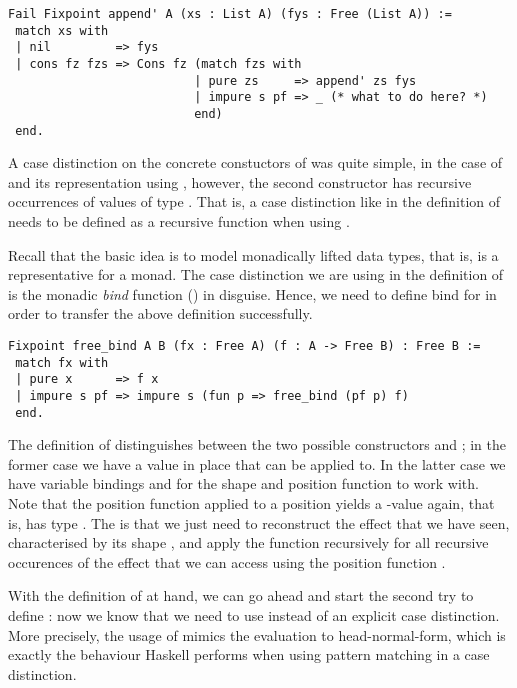 \begin{verbatim}
Fail Fixpoint append' A (xs : List A) (fys : Free (List A)) :=
 match xs with
 | nil         => fys
 | cons fz fzs => Cons fz (match fzs with
                          | pure zs     => append' zs fys
                          | impure s pf => _ (* what to do here? *)
                          end)
 end.
\end{verbatim}

A case distinction on the concrete constuctors of  was quite simple, in the case of  and its representation using , however, the second constructor  has recursive occurrences of values of type .
That is, a case distinction like in the definition of  needs to be defined as a recursive function when using .

Recall that the basic idea is to model monadically lifted data types, that is,  is a representative for a monad.
The case distinction we are using in the definition of  is the monadic \emph{bind} function (\cinl{(>>=)}) in disguise.
Hence, we need to define bind for  in order to transfer the above definition successfully.

\begin{verbatim}
Fixpoint free_bind A B (fx : Free A) (f : A -> Free B) : Free B :=
 match fx with
 | pure x      => f x
 | impure s pf => impure s (fun p => free_bind (pf p) f)
 end.
\end{verbatim}

The definition of  distinguishes between the two possible constructors  and ; in the former case we have a value  in place that  can be applied to.
In the latter case we have variable bindings  and  for the shape and position function to work with.
Note that the position function applied to a position yields a -value again, that is,  has type
.
The is that we just need to reconstruct the effect that we have seen, characterised by its shape , and apply the function  recursively for all recursive occurences of the effect that we can access using the position function .

With the definition of  at hand, we can go ahead and start the second try to define : now we know that we need to use  instead of an explicit case distinction.
More precisely, the usage of  mimics the evaluation to head-normal-form, which is exactly the behaviour Haskell performs when using pattern matching in a case distinction.

